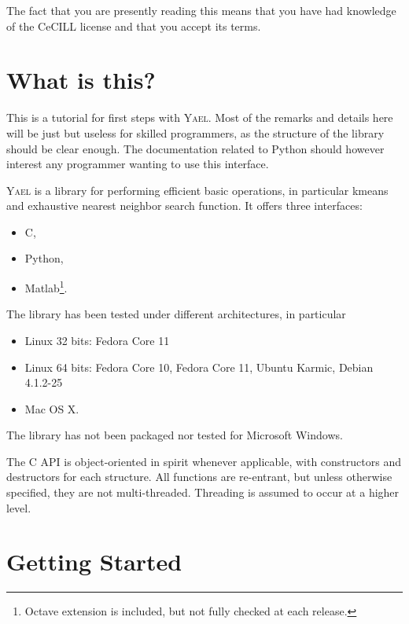 \documentclass[a4paper,11pt,notitlepage,final,twoside]{report}
\newcommand{\yael}{\textsc{Yael}\xspace}
\begin{document}
The fact that you are presently reading this means that you have had
knowledge of the CeCILL license and that you accept its terms.


\tableofcontents            %


\chapter{What is this?}

This is a tutorial for first steps with \yael. Most of the remarks and details here will be just but useless for skilled programmers, as the structure of the library should be clear enough. The documentation related to Python should however interest any programmer wanting to use this interface. 
\medskip

\yael is a library for performing efficient basic operations, 
in particular kmeans and exhaustive nearest neighbor search function.
It offers three interfaces: 
\begin{itemize}
\item C, 
\item Python, 
\item Matlab\footnote{Octave extension is included, but not fully checked at each release.}.
\end{itemize}

The library has been tested under different architectures, in particular
\begin{itemize}
\item Linux 32 bits: Fedora Core 11
\item Linux 64 bits: Fedora Core 10, Fedora Core 11, Ubuntu Karmic, Debian 4.1.2-25
\item Mac OS X. 
\end{itemize}
The library has not been packaged nor tested for Microsoft Windows. 

The C API is object-oriented in spirit whenever applicable, with constructors and destructors for each structure. All functions are re-entrant, but unless otherwise specified, they are not multi-threaded. Threading is assumed to occur at a higher level. 


\chapter{Getting Started}
\label{cha:gettingstarted}
\end{document}
